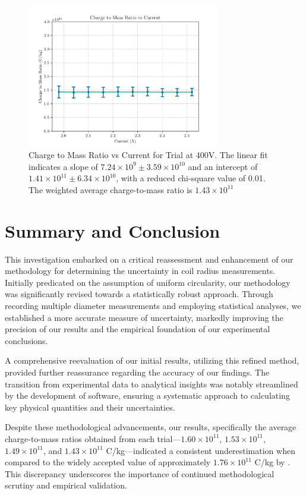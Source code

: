 \documentclass{article}
\begin{document}
\begin{figure}[H]
    \centering
    \includegraphics[width=0.75\textwidth]{trial_400.png}
    \caption{Charge to Mass Ratio vs Current for Trial at 400V. The linear fit indicates a slope of \(7.24 \times 10^{9} \pm 3.59 \times 10^{10}\) and an intercept of \(1.41 \times 10^{11} \pm 6.34 \times 10^{10}\), with a reduced chi-square value of 0.01. The weighted average charge-to-mass ratio is \(1.43 \times 10^{11}\)}
    \label{fig:trial400}
\end{figure}


\section{Summary and Conclusion}
\label{sec:summary-conclusion}

This investigation embarked on a critical reassessment and enhancement of our methodology for determining the uncertainty in coil radius measurements. Initially predicated on the assumption of uniform circularity, our methodology was significantly revised towards a statistically robust approach. Through recording multiple diameter measurements and employing statistical analyses, we established a more accurate measure of uncertainty, markedly improving the precision of our results and the empirical foundation of our experimental conclusions.

A comprehensive reevaluation of our initial results, utilizing this refined method, provided further reassurance regarding the accuracy of our findings. The transition from experimental data to analytical insights was notably streamlined by the development of software, ensuring a systematic approach to calculating key physical quantities and their uncertainties.

Despite these methodological advancements, our results, specifically the average charge-to-mass ratios obtained from each trial—\(1.60 \times 10^{11}\), \(1.53 \times 10^{11}\), \(1.49 \times 10^{11}\), and \(1.43 \times 10^{11}\) C/kg—indicated a consistent underestimation when compared to the widely accepted value of approximately \(1.76 \times 10^{11}\) C/kg by \textcite{Newell2018}. This discrepancy underscores the importance of continued methodological scrutiny and empirical validation.
\end{document}
